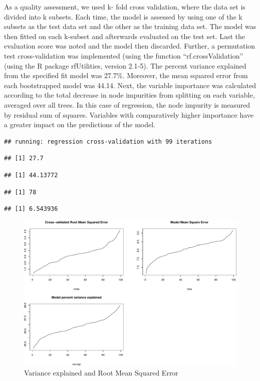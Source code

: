 \documentclass[
]{article}
\begin{document}
As a quality assessment, we used k- fold cross validation, where the
data set is divided into k subsets. Each time, the model is assessed by
using one of the k subsets as the test data set and the other as the
training data set. The model was then fitted on each k-subset and
afterwards evaluated on the test set. Last the evaluation score was
noted and the model then discarded. Further, a permutation test
cross-validation was implemented (using the function
``rf.crossValidation'' (using the R package rfUtilities, version 2.1-5).
The percent variance explained from the specified fit model was 27.7\%.
Moreover, the mean squared error from each bootstrapped model was 44.14.
Next, the variable importance was calculated according to the total
decrease in node impurities from splitting on each variable, averaged
over all trees. In this case of regression, the node impurity is
measured by residual sum of squares. Variables with comparatively higher
importance have a greater impact on the predictions of the model.

\begin{verbatim}
## running: regression cross-validation with 99 iterations
\end{verbatim}

\begin{verbatim}
## [1] 27.7
\end{verbatim}

\begin{verbatim}
## [1] 44.13772
\end{verbatim}

\begin{verbatim}
## [1] 78
\end{verbatim}

\begin{verbatim}
## [1] 6.543936
\end{verbatim}

\begin{figure}[th]
\includegraphics[width=1\linewidth]{TAC_report_2022_files/figure-latex/fig4-1} \caption{Variance explained and Root Mean Squared Error}\label{fig:fig4}
\end{figure}
\end{document}
